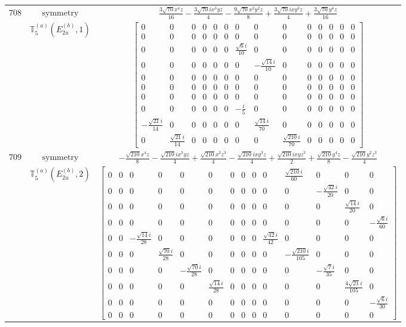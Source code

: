\documentclass[fleqn,8pt,landscape]{jsarticle}
\begin{document}
\begin{longtable}{ccc}
$ 708 $ & $ \text{symmetry} $ & $ \frac{3 \sqrt{70} x^{4} z}{16} - \frac{3 \sqrt{70} i x^{3} y z}{4} - \frac{9 \sqrt{70} x^{2} y^{2} z}{8} + \frac{3 \sqrt{70} i x y^{3} z}{4} + \frac{3 \sqrt{70} y^{4} z}{16} $ \\
$  $ & $ \mathbb{T}_{5}^{(a)}(E_{2u}^{(b)},1) $ & $ \begin{bmatrix} 0 & 0 & 0 & 0 & 0 & 0 & 0 & 0 & 0 & 0 & 0 & 0 & 0 & 0 \\ 0 & 0 & 0 & 0 & 0 & 0 & 0 & 0 & 0 & 0 & 0 & 0 & 0 & 0 \\ 0 & 0 & 0 & 0 & 0 & 0 & \frac{\sqrt{6} i}{10} & 0 & 0 & 0 & 0 & 0 & 0 & 0 \\ 0 & 0 & 0 & 0 & 0 & 0 & 0 & - \frac{\sqrt{14} i}{10} & 0 & 0 & 0 & 0 & 0 & 0 \\ 0 & 0 & 0 & 0 & 0 & 0 & 0 & 0 & 0 & 0 & 0 & 0 & 0 & 0 \\ 0 & 0 & 0 & 0 & 0 & 0 & 0 & 0 & 0 & 0 & 0 & 0 & 0 & 0 \\ 0 & 0 & 0 & 0 & 0 & 0 & 0 & 0 & 0 & 0 & 0 & 0 & 0 & 0 \\ 0 & 0 & 0 & 0 & 0 & 0 & - \frac{i}{5} & 0 & 0 & 0 & 0 & 0 & 0 & 0 \\ - \frac{\sqrt{21} i}{14} & 0 & 0 & 0 & 0 & 0 & 0 & \frac{\sqrt{14} i}{70} & 0 & 0 & 0 & 0 & 0 & 0 \\ 0 & \frac{\sqrt{21} i}{14} & 0 & 0 & 0 & 0 & 0 & 0 & \frac{\sqrt{210} i}{70} & 0 & 0 & 0 & 0 & 0 \end{bmatrix} $ \\ \hline
$ 709 $ & $ \text{symmetry} $ & $ - \frac{\sqrt{210} x^{4} z}{8} - \frac{\sqrt{210} i x^{3} y z}{4} + \frac{\sqrt{210} x^{2} z^{3}}{4} - \frac{\sqrt{210} i x y^{3} z}{4} + \frac{\sqrt{210} i x y z^{3}}{2} + \frac{\sqrt{210} y^{4} z}{8} - \frac{\sqrt{210} y^{2} z^{3}}{4} $ \\
$  $ & $ \mathbb{T}_{5}^{(a)}(E_{2u}^{(b)},2) $ & $ \begin{bmatrix} 0 & 0 & 0 & 0 & 0 & 0 & 0 & 0 & 0 & 0 & \frac{\sqrt{210} i}{60} & 0 & 0 & 0 \\ 0 & 0 & 0 & 0 & 0 & 0 & 0 & 0 & 0 & 0 & 0 & - \frac{\sqrt{42} i}{20} & 0 & 0 \\ 0 & 0 & 0 & 0 & 0 & 0 & 0 & 0 & 0 & 0 & 0 & 0 & \frac{\sqrt{14} i}{20} & 0 \\ 0 & 0 & 0 & 0 & 0 & 0 & 0 & 0 & 0 & 0 & 0 & 0 & 0 & - \frac{\sqrt{6} i}{60} \\ 0 & 0 & - \frac{\sqrt{14} i}{28} & 0 & 0 & 0 & 0 & 0 & 0 & \frac{\sqrt{42} i}{42} & 0 & 0 & 0 & 0 \\ 0 & 0 & 0 & \frac{\sqrt{70} i}{28} & 0 & 0 & 0 & 0 & 0 & 0 & - \frac{\sqrt{210} i}{105} & 0 & 0 & 0 \\ 0 & 0 & 0 & 0 & - \frac{\sqrt{70} i}{28} & 0 & 0 & 0 & 0 & 0 & 0 & - \frac{\sqrt{7} i}{35} & 0 & 0 \\ 0 & 0 & 0 & 0 & 0 & \frac{\sqrt{14} i}{28} & 0 & 0 & 0 & 0 & 0 & 0 & \frac{4 \sqrt{21} i}{105} & 0 \\ 0 & 0 & 0 & 0 & 0 & 0 & 0 & 0 & 0 & 0 & 0 & 0 & 0 & - \frac{\sqrt{6} i}{30} \\ 0 & 0 & 0 & 0 & 0 & 0 & 0 & 0 & 0 & 0 & 0 & 0 & 0 & 0 \end{bmatrix} $ \\ \hline

\end{longtable}
\end{document}
